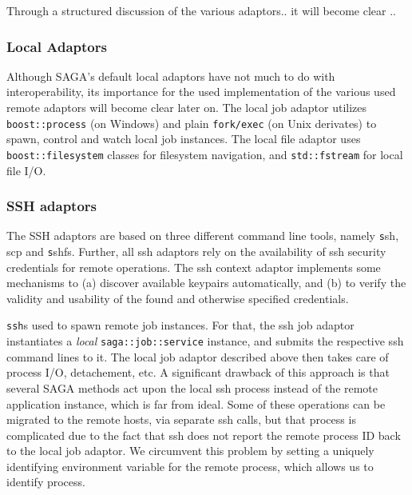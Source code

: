\documentclass[conference,final]{IEEEtran}
\newcommand{\T}[1]{\texttt{#1}}
\newcommand{\I}[1]{\textit{#1}}
\newcommand{\ssh}[1]{\texttt{ssh}}
\begin{document}
 

Through a structured discussion of the various adaptors.. 
it will become clear ..

\subsubsection{Local Adaptors}
Although SAGA's default local adaptors have not much to do with
interoperability, its importance for the used implementation of the
various used remote adaptors will become clear later on.  The local
job adaptor utilizes \T{boost::process} (on Windows) and plain
\T{fork/exec} (on Unix derivates) to spawn, control and watch local
job instances.  The local file adaptor uses \T{boost::filesystem}
classes for filesystem navigation, and \T{std::fstream} for local file
I/O. %

\subsubsection{SSH adaptors}
The SSH adaptors are based on three different command line tools,
namely {\texttt ssh, scp} and {\texttt sshfs}.  Further, all ssh
adaptors rely on the availability of ssh security credentials for
remote operations.  The ssh context adaptor implements some mechanisms
to (a) discover available keypairs automatically, and (b) to verify
the validity and usability of the found and otherwise specified
credentials.
  
\ssh is used to spawn remote job instances.  For that, the ssh job
adaptor instantiates a \I{local} \T{saga::job::service} instance, and
submits the respective ssh command lines to it.  The local job adaptor
described above then takes care of process I/O, detachement, etc.  A
significant drawback of this approach is that several SAGA methods act
upon the local ssh process instead of the remote application instance,
which is far from ideal. Some of these operations can be migrated to
the remote hosts, via separate ssh calls, but that process is
complicated due to the fact that ssh does not report the remote
process ID back to the local job adaptor.  We circumvent this problem
by setting a uniquely identifying environment variable for the remote
process, which allows us to identify process.
\end{document}
